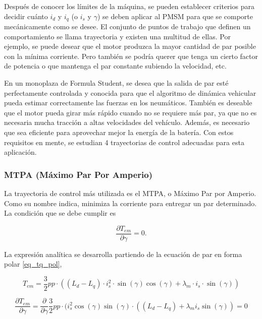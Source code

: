 Después de conocer los límites de la máquina, se pueden establecer criterios para decidir cuánto \(i_d\) y \(i_q\) (o \(i_s\) y \(\gamma\)) se deben aplicar al PMSM para que se comporte mecánicamente como se desee. El conjunto de puntos de trabajo que definen un comportamiento se llama trayectoria y existen una multitud de ellas. Por ejemplo, se puede desear que el motor produzca la mayor cantidad de par posible con la mínima corriente. Pero también se podría querer que tenga un cierto factor de potencia o que mantenga el par constante subiendo la velocidad, etc.

En un monoplaza de Formula Student, se desea que la salida de par esté perfectamente controlada y conocida para que el algoritmo de dinámica vehicular pueda estimar correctamente las fuerzas en los neumáticos. También es deseable que el motor pueda girar más rápido cuando no se requiere más par, ya que no es necesaria mucha tracción a altas velocidades del vehículo. Además, es necesario que sea eficiente para aprovechar mejor la energía de la batería. Con estos requisitos en mente, se estudian 4 trayectorias de control adecuadas para esta aplicación.

\subsubsection{MTPA (Máximo Par Por Amperio)}

La trayectoria de control más utilizada es el MTPA, o Máximo Par por Amperio. Como su nombre indica, minimiza la corriente para entregar un par determinado. La condición que se debe cumplir es

\begin{equation}
	\frac{\partial T_{em}}{\partial \gamma} = 0 \text{.}
\end{equation}


La expresión analítica se desarrolla partiendo de la ecuación de par en forma polar \ref{eq_tq_pol},

\begin{equation*}
	T_{em} = \frac{3}{2}pp\cdot((L_d - L_q)\cdot i_s^2 \cdot \sin(\gamma)\cos(\gamma) + \lambda_m\cdot i_s\cdot \sin(\gamma))
\end{equation*}


\begin{equation}
\frac{\partial T_{em}}{\partial \gamma} = \frac{\partial}{\partial \gamma} \frac{3}{2}pp\cdot(i_s^2 \cos(\gamma)\sin(\gamma)\cdot((L_d - L_q) + \lambda_m i_s \sin(\gamma)) = 0
\end{equation}

